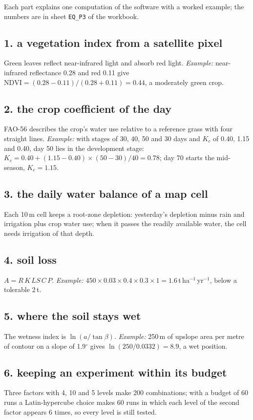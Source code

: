 Each part explains one computation of the software with a worked example; the numbers are in sheet \texttt{EQ\_P3} of the workbook.

\subsection{1. a vegetation index from a satellite pixel}
Green leaves reflect near-infrared light and absorb red light. \emph{Example:} near-infrared reflectance 0.28 and red 0.11 give $\mathrm{NDVI}=(0.28-0.11)/(0.28+0.11)=0.44$, a moderately green crop.

\subsection{2. the crop coefficient of the day}
FAO-56 describes the crop's water use relative to a reference grass with four straight lines. \emph{Example:} with stages of 30, 40, 50 and 30 days and $K_c$ of 0.40, 1.15 and 0.40, day 50 lies in the development stage: $K_c=0.40+(1.15-0.40)\times(50-30)/40=0.78$; day 70 starts the mid-season, $K_c=1.15$.

\subsection{3. the daily water balance of a map cell}
Each 10\,m cell keeps a root-zone depletion: yesterday's depletion minus rain and irrigation plus crop water use; when it passes the readily available water, the cell needs irrigation of that depth.

\subsection{4. soil loss}
$A=R\,K\,LS\,C\,P$. \emph{Example:} $450\times0.03\times0.4\times0.3\times1=1.6$\,t\,ha$^{-1}$\,yr$^{-1}$, below a tolerable 2\,t.

\subsection{5. where the soil stays wet}
The wetness index is $\ln(a/\tan\beta)$. \emph{Example:} 250\,m of upslope area per metre of contour on a slope of 1.9$^\circ$ gives $\ln(250/0.0332)=8.9$, a wet position.

\subsection{6. keeping an experiment within its budget}
Three factors with 4, 10 and 5 levels make 200 combinations; with a budget of 60 runs a Latin-hypercube choice makes 60 runs in which each level of the second factor appears 6 times, so every level is still tested.

